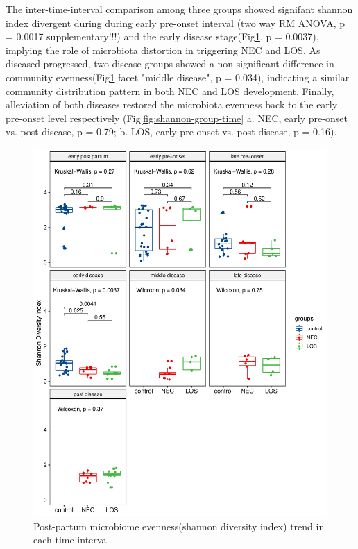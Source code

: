 \documentclass[fleqn,10pt, lineno]{wlpeerj} %
\begin{document}
    \noindent
    The inter-time-interval comparison among three groups showed signifant shannon index divergent during during early pre-onset interval (two way RM ANOVA, p = 0.0017 supplementary!!!) and the early disease stage(Fig\ref{fig:shannon-time-groups}, p = 0.0037), implying the role of microbiota distortion in triggering NEC and LOS. As diseased progressed, two disease groups showed a non-significant difference in community evenness(Fig\ref{fig:shannon-time-groups} facet "middle disease", p = 0.034), indicating a similar community distribution pattern in both NEC and LOS development. Finally, alleviation of both diseases restored the microbiota evenness back to the early pre-onset level respectively (Fig\ref{fig:shannon-group-time} a. NEC, early pre-onset vs. post disease, p = 0.79; b. LOS, early pre-onset vs. post disease, p = 0.16).
    \begin{figure}[ht]\centering
      \includegraphics[width=\linewidth]{figure/shannon-time-groups.pdf}
      \caption{Post-partum microbiome evenness(shannon diversity index) trend in each time interval}
      \label{fig:shannon-time-groups}
    \end{figure}
\end{document}
